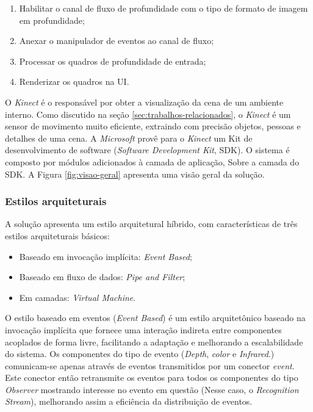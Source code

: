 \begin{enumerate}
    \item Habilitar o canal de fluxo de profundidade com o tipo de formato de imagem em profundidade; 
    \item Anexar o manipulador de eventos ao canal de fluxo; 
    \item Processar os quadros de profundidade de entrada; 
    \item Renderizar os quadros na UI.
\end{enumerate}

O \textit{Kinect} é o responsável por obter a visualização da cena de um ambiente interno. Como discutido na seção \ref{sec:trabalhos-relacionados}, o \textit{Kinect} é um sensor de movimento muito eficiente, extraindo com precisão objetos, pessoas e detalhes de uma cena. A \textit{Microsoft} provê para o \textit{Kinect} um Kit de desenvolvimento de software (\textit{Software Development Kit}, SDK). O sistema é composto por módulos adicionados à camada de aplicação, Sobre a camada do SDK. A Figura \ref{fig:visao-geral} apresenta uma visão geral da solução.

\subsubsection{Estilos arquiteturais}\label{sec:estilosArq}
A solução apresenta um estilo arquitetural híbrido, com características de três estilos arquiteturais básicos:

\begin{itemize}
\item Baseado em invocação implícita: \textit{Event Based}; 
\item Baseado em fluxo de dados: \textit{Pipe and Filter}; 
\item Em camadas: \textit{Virtual Machine}.
\end{itemize}

O estilo baseado em eventos (\textit{Event Based}) é um estilo arquitetônico baseado na invocação implícita que fornece uma interação indireta entre componentes acoplados de forma livre, facilitando a adaptação e melhorando a escalabilidade do sistema. Os componentes do tipo de evento (\textit{Depth}, \textit{color} e \textit{Infrared}.) comunicam-se apenas através de eventos transmitidos por um conector \textit{event}.
Este conector então retransmite os eventos para todos os componentes do tipo \textit{Observer} mostrando interesse no evento em questão (Nesse caso, o \textit{Recognition Stream}), melhorando assim a eficiência da distribuição de eventos.

